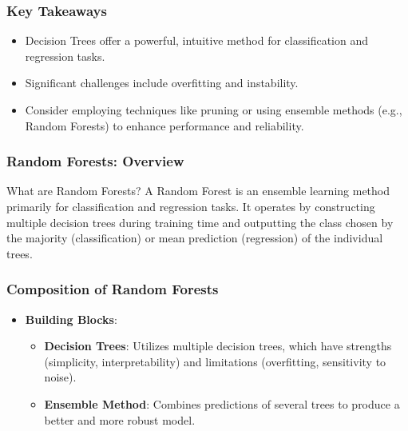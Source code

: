 \documentclass[aspectratio=169]{beamer}
\begin{document}
\begin{frame}[fragile]
    \frametitle{Key Takeaways}
    \begin{itemize}
        \item Decision Trees offer a powerful, intuitive method for classification and regression tasks.
        \item Significant challenges include overfitting and instability.
        \item Consider employing techniques like pruning or using ensemble methods (e.g., Random Forests) to enhance performance and reliability.
    \end{itemize}
\end{frame}

\begin{frame}
    \frametitle{Random Forests: Overview}
    \begin{block}{What are Random Forests?}
        A Random Forest is an ensemble learning method primarily for classification and regression tasks. It operates by constructing multiple decision trees during training time and outputting the class chosen by the majority (classification) or mean prediction (regression) of the individual trees.
    \end{block}
\end{frame}

\begin{frame}
    \frametitle{Composition of Random Forests}
    \begin{itemize}
        \item \textbf{Building Blocks}:
        \begin{itemize}
            \item \textbf{Decision Trees}: Utilizes multiple decision trees, which have strengths (simplicity, interpretability) and limitations (overfitting, sensitivity to noise).
            \item \textbf{Ensemble Method}: Combines predictions of several trees to produce a better and more robust model.
        \end{itemize}
    \end{itemize}
\end{frame}
\end{document}
